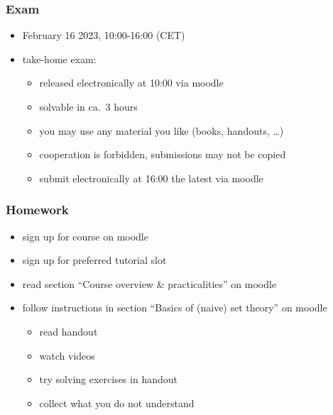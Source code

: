 \documentclass[fleqn,10pt,serif,xcolor=svgnames,xcolor=table,aspectratio=169,handout]{beamer}
\begin{document}
\begin{frame}
  \frametitle{Exam}
  \begin{itemize}
    \item February 16 2023, 10:00-16:00 (CET)
    \item take-home exam:
    \begin{itemize}
      \item released electronically at 10:00 via moodle
      \item solvable in ca.~3 hours
      \item you may use any material you like (books, handouts, \dots)
      \item cooperation is forbidden, submissions may not be copied
      \item submit electronically at 16:00 the latest via moodle
    \end{itemize}
  \end{itemize}
\end{frame}

\begin{frame}
  \frametitle{Homework}

  \begin{itemize}
    \item sign up for course on moodle
    \item sign up for preferred tutorial slot
    \item read section ``Course overview \& practicalities'' on moodle
    \item follow instructions in section ``Basics of (naive) set theory'' on moodle
    \begin{itemize}
      \item read handout
      \item watch videos
      \item try solving exercises in handout
      \item collect what you do not understand
    \end{itemize}
  \end{itemize}

\end{frame}
\end{document}
